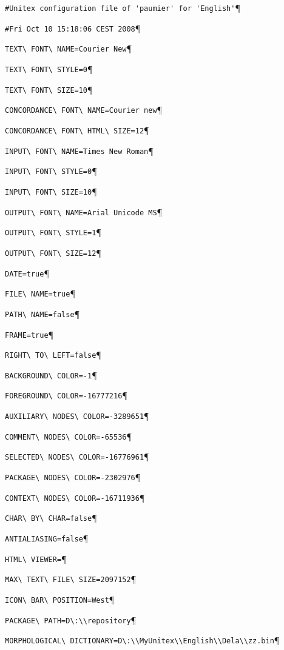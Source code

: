 \bigskip
\verb$#Unitex configuration file of 'paumier' for 'English'$\P

\verb$#Fri Oct 10 15:18:06 CEST 2008$\P

\verb$TEXT\ FONT\ NAME=Courier New$\P

\verb$TEXT\ FONT\ STYLE=0$\P

\verb$TEXT\ FONT\ SIZE=10$\P

\verb$CONCORDANCE\ FONT\ NAME=Courier new$\P

\verb$CONCORDANCE\ FONT\ HTML\ SIZE=12$\P

\verb$INPUT\ FONT\ NAME=Times New Roman$\P

\verb$INPUT\ FONT\ STYLE=0$\P

\verb$INPUT\ FONT\ SIZE=10$\P

\verb$OUTPUT\ FONT\ NAME=Arial Unicode MS$\P

\verb$OUTPUT\ FONT\ STYLE=1$\P

\verb$OUTPUT\ FONT\ SIZE=12$\P

\verb$DATE=true$\P

\verb$FILE\ NAME=true$\P

\verb$PATH\ NAME=false$\P

\verb$FRAME=true$\P

\verb$RIGHT\ TO\ LEFT=false$\P

\verb$BACKGROUND\ COLOR=-1$\P

\verb$FOREGROUND\ COLOR=-16777216$\P

\verb$AUXILIARY\ NODES\ COLOR=-3289651$\P

\verb$COMMENT\ NODES\ COLOR=-65536$\P

\verb$SELECTED\ NODES\ COLOR=-16776961$\P

\verb$PACKAGE\ NODES\ COLOR=-2302976$\P

\verb$CONTEXT\ NODES\ COLOR=-16711936$\P

\verb$CHAR\ BY\ CHAR=false$\P

\verb$ANTIALIASING=false$\P

\verb$HTML\ VIEWER=$\P

\verb$MAX\ TEXT\ FILE\ SIZE=2097152$\P

\verb$ICON\ BAR\ POSITION=West$\P

\verb$PACKAGE\ PATH=D\:\\repository$\P

\verb$MORPHOLOGICAL\ DICTIONARY=D\:\\MyUnitex\\English\\Dela\\zz.bin$\P


